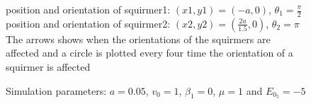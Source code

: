 \documentclass{article}
\begin{document}
\begin{figure}[H]
\begin{minipage}{0.49\textwidth}
        \caption{\footnotesize Simulation parameters: $a=0.05$, $v_0=1$, $\beta_1=0$, $\mu=1$ and $E_{0_{5}}=-5$}
    \end{minipage}
    position and orientation of squirmer1: $(x1,y1)=(-a,0)$, $\theta_1=\frac{\pi}{2}$\\
    position and orientation of squirmer2: $(x2,y2)=(\frac{2a}{1.5},0)$, $\theta_2=\pi$\\
    The arrows shows when the orientations of the squirmers are affected and a circle is plotted every four time the orientation of a squirmer is affected
\end{figure}

\newpage

\nocite{*}


\end{document}
